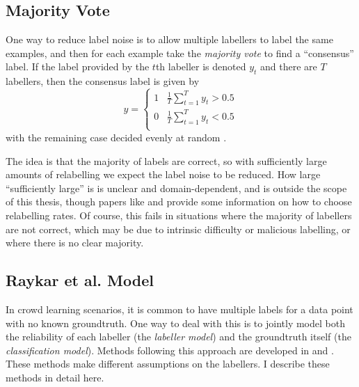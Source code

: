     \subsection{Majority Vote}
    \label{sec:majority-vote}

        One way to reduce label noise is to allow multiple labellers to label the same examples, and then for each example take the \emph{majority vote} to find a ``consensus'' label. If the label provided by the $t$th labeller is denoted $y_t$ and there are $T$ labellers, then the consensus label is given by
        \begin{equation*}
            y = \begin{cases}
                1 & \frac{1}{T} \sum_{t = 1}^T y_t > 0.5\\
                0 & \frac{1}{T} \sum_{t = 1}^T y_t < 0.5\\
            \end{cases}
        \end{equation*}
        with the remaining case decided evenly at random \citep{raykar10}.

        The idea is that the majority of labels are correct, so with sufficiently large amounts of relabelling we expect the label noise to be reduced. How large ``sufficiently large'' is is unclear and domain-dependent, and is outside the scope of this thesis, though papers like \citet{sheng08} and \citet{lin16} provide some information on how to choose relabelling rates. Of course, this fails in situations where the majority of labellers are not correct, which may be due to intrinsic difficulty or malicious labelling, or where there is no clear majority.


    \subsection{Raykar et al. Model}
    \label{sec:raykar}


        In crowd learning scenarios, it is common to have multiple labels for a data point with no known groundtruth. One way to deal with this is to jointly model both the reliability of each labeller (the \emph{labeller model}) and the groundtruth itself (the \emph{classification model}). Methods following this approach are developed in \citet{raykar10} and \citet{yan10}. These methods make different assumptions on the labellers. I describe these methods in detail here.

